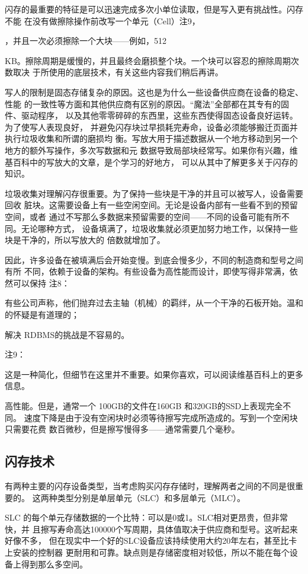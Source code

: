 闪存的最重要的特征是可以迅速完成多次小单位读取，但是写入更有挑战性。闪存不能
在没有做擦除操作前改写一个单元（Cell）注9，

，并且一次必须擦除一个大块——例如，512

KB。擦除周期是缓慢的，并且最终会磨损整个块。一个块可以容忍的擦除周期次数取决
于所使用的底层技术，有关这些内容我们稍后再讲。

写人的限制是固态存储复杂的原因。这也是为什么一些设备供应商在设备的稳定、性能
的一致性等方面和其他供应商有区别的原因。“魔法”全部都在其专有的固件、驱动程序，
以及其他零零碎碎的东西里，这些东西使得固态设备良好运转。为了使写人表现良好，
并避免闪存块过早损耗完寿命，设备必须能够搬迁页面并执行垃圾收集和所谓的磨损均
衡。写放大用于描述数据从一个地方移动到另一个地方的额外写操作，多次写数据和元
数据导致局部块经常写。如果你有兴趣，维基百科中的写放大的文章，是个学习的好地方，
可以从其中了解更多关于闪存的知识。

垃圾收集对理解闪存很重要。为了保持一些块是干净的并且可以被写人，设备需要回收
脏块。这需要设备上有一些空闲空间。无论是设备内部有一些看不到的预留空间，或者
通过不写那么多数据来预留需要的空间——不同的设备可能有所不同。无论哪种方式，
设备填满了，垃圾收集就必须更加努力地工作，以保持一些块是干净的，所以写放大的
倍数就增加了。

因此，许多设备在被填满后会开始变慢。到底会慢多少，不同的制造商和型号之间有所
不同，依赖于设备的架构。有些设备为高性能而设计，即使写得非常满，依然可以保持
注8：

有些公司声称，他们抛弃过去主轴（机械）的羁绊，从一个干净的石板开始。温和的怀疑是有道理的；

解决 RDBMS的挑战是不容易的。

注9：

这是一种简化，但细节在这里并不重要。如果你喜欢，可以阅读维基百科上的更多信息。

高性能。但是，通常一个 100GB的文件在160GB 和320GB的SSD上表现完全不同。
速度下降是由于没有空闲块时必须等待擦写完成所造成的。写到一个空闲块只需要花费
数百微秒，但是擦写慢得多——通常需要几个毫秒。

\subsection{闪存技术}
有两种主要的闪存设备类型，当考虑购买闪存存储时，理解两者之间的不同是很重要的。
这两种类型分别是单层单元（SLC）和多层单元（MLC）。

SLC 的每个单元存储数据的一个比特：可以是0或1。SLC相对更昂贵，但非常快，并
且擦写寿命高达100000个写周期，具体值取决于供应商和型号。这听起来好像不多，
但在现实中一个好的SLC设备应该持续使用大约20年左右，甚至比卡上安装的控制器
更耐用和可靠。缺点则是存储密度相对较低，所以不能在每个设备上得到那么多空间。

